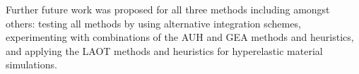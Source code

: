 \documentclass[11pt]{article}
\begin{document}
Further future work was proposed for all three methods including amongst
others: testing all methods by using alternative integration schemes,
experimenting with combinations of the AUH and GEA methods and heuristics,
and applying the LAOT methods and heuristics for hyperelastic material
simulations.






\end{document}
